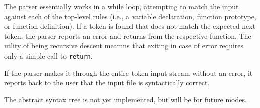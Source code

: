The parser essentially works in a while loop, attempting to match the input
against each of the top-level rules (i.e., a variable declaration, function
prototype, or function definition). If a token is found that does not match the
expected next token, the parser reports an error and returns from the respective
function. The utlity of being recursive descent meamns that exiting in case of
error requires only a simple call to \verb|return|. 

If the parser makes it through the entire token input stream without an error,
it reports back to the user that the input file is syntactically correct.

The abstract syntax tree is not yet implemented, but will be for future modes.